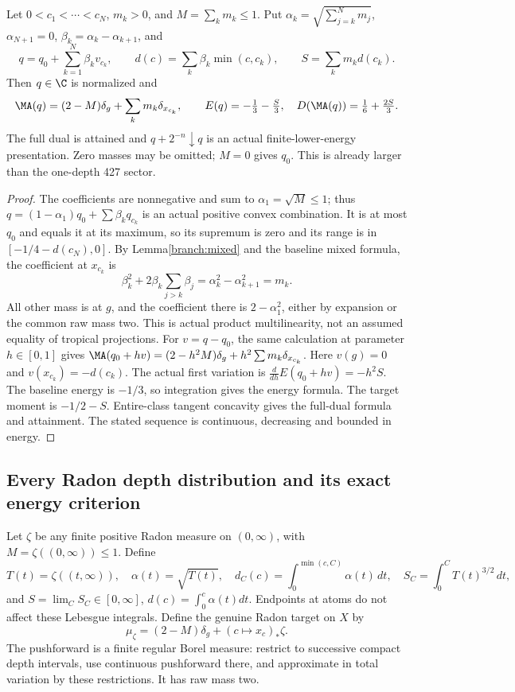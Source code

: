 \begin{theorem}\label{branch:finite}
Let $0<c_1<\cdots<c_N$, $m_k>0$, and $M=\sum_km_k\le1$.
Put $\alpha_k=\sqrt{\sum_{j=k}^Nm_j}$, $\alpha_{N+1}=0$,
$\beta_k=\alpha_k-\alpha_{k+1}$, and
\[
 q=q_0+\sum_{k=1}^N\beta_kv_{c_k},\qquad
 d(c)=\sum_k\beta_k\min(c,c_k),\qquad S=\sum_km_kd(c_k).
\]
Then $q\in\C$ is normalized and
\[
 \MA(q)=(2-M)\delta_g+\sum_km_k\delta_{x_{c_k}},\qquad
 E(q)=-\tfrac13-\tfrac S3,\quad
 D(\MA(q))=\tfrac16+\tfrac{2S}3.
\]
The full dual is attained and $q+2^{-n}\downarrow q$ is an actual
finite-lower-energy presentation. Zero masses may be omitted; $M=0$
gives $q_0$. This is already larger than the one-depth 427 sector.
\end{theorem}
\begin{proof}
The coefficients are nonnegative and sum to $\alpha_1=\sqrt M\le1$;
thus $q=(1-\alpha_1)q_0+\sum\beta_kq_{c_k}$ is an actual positive
convex combination. It is at most $q_0$ and equals it at its maximum,
so its supremum is zero and its range is in $[-1/4-d(c_N),0]$.
By Lemma\ref{branch:mixed} and the baseline mixed formula, the coefficient
at $x_{c_k}$ is
\[
 \beta_k^2+2\beta_k\sum_{j>k}\beta_j
 =\alpha_k^2-\alpha_{k+1}^2=m_k.
\]
All other mass is at $g$, and the coefficient there is $2-\alpha_1^2$,
either by expansion or the common raw mass two. This is actual product
multilinearity, not an assumed equality of tropical projections.
For $v=q-q_0$, the same calculation at parameter $h\in[0,1]$ gives
$\MA(q_0+hv)=(2-h^2M)\delta_g+h^2\sum m_k\delta_{x_{c_k}}$.
Here $v(g)=0$ and $v(x_{c_k})=-d(c_k)$. The actual first variation is
$\frac{d}{dh}E(q_0+hv)=-h^2S$. The baseline energy is $-1/3$,
so integration gives the energy formula. The target moment is $-1/2-S$.
Entire-class tangent concavity gives the full-dual formula and attainment.
The stated sequence is continuous, decreasing and bounded in energy.
\end{proof}

\subsection{Every Radon depth distribution and its exact energy criterion}
Let $\zeta$ be any finite positive Radon measure on $(0,\infty)$, with
$M=\zeta((0,\infty))\le1$. Define
\[
 T(t)=\zeta((t,\infty)),\quad \alpha(t)=\sqrt{T(t)},\quad
 d_C(c)=\int_0^{\min(c,C)}\alpha(t)\,dt,\quad
 S_C=\int_0^C T(t)^{3/2}\,dt,
\]
and $S=\lim_CS_C\in[0,\infty]$, $d(c)=\int_0^c\alpha(t)dt$.
Endpoints at atoms do not affect these Lebesgue integrals.
Define the genuine Radon target on $X$ by
\[
 \mu_\zeta=(2-M)\delta_g+(c\mapsto x_c)_*\zeta.
\]
The pushforward is a finite regular Borel measure: restrict to successive
compact depth intervals, use continuous pushforward there, and approximate
in total variation by these restrictions. It has raw mass two.

